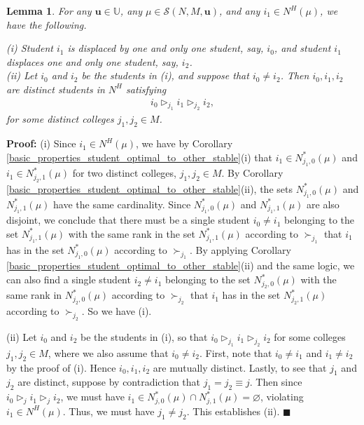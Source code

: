 \documentclass[12pt, fullpage]{amsart}
\newtheorem{lemma}{Lemma}[section]
\theoremstyle{definition}
\theoremstyle{definition}
\theoremstyle{definition}
\begin{document}
\begin{bibunit}[econometrica]
\begin{lemma}\label{every_student_displaces_and_is_displaced}
For any $\boldsymbol{u}\in \mathbb{U}$, any $\mu \in  \mathcal{S}(N,M,\boldsymbol{u})$, and any $i_{1}\in N^{H}(\mu)$, we have the following.

\noindent (i) Student $i_{1}$ is displaced by one and only one student, say, $i_{0}$, and student $i_{1}$ displaces one and only one student, say, $i_{2}$.\\
\noindent (ii)  Let $i_{0}$ and $i_{2}$ be the students in (i), and suppose that $i_{0}\ne i_{2}$. Then $i_{0},i_{1},i_{2}$ are distinct students in $N^{H}$ satisfying 
\begin{align}
	i_{0}\vartriangleright_{j_{1}} i_{1}\vartriangleright_{j_{2}} i_{2},
\end{align}
for some distinct colleges $j_{1},j_{2}\in M$.

\end{lemma}
\noindent \textbf{Proof: } (i) Since $i_{1}\in N^{H}(\mu)$, we have by Corollary \ref{basic_properties_student_optimal_to_other_stable}(i) that   $i_{1}\in N^{*}_{j_{1},0}(\mu)$ and $i_{1}\in N^{*}_{j_{2},1}(\mu)$ for two distinct colleges, $j_{1},j_{2}\in M$. By Corollary \ref{basic_properties_student_optimal_to_other_stable}(ii), the sets $N^{*}_{j_{1},0}(\mu)$ and $N^{*}_{j_{1},1}(\mu)$ have the same cardinality. Since $N^{*}_{j_{1},0}(\mu)$ and $N^{*}_{j_{1},1}(\mu)$ are also disjoint, we conclude that there must be a single student $i_{0}\ne i_{1}$ belonging to the set $N^{*}_{j_{1},1}(\mu)$ with the same rank in the set $N^{*}_{j_{1},1}(\mu)$ according to $\succ_{j_{1}}$ that $i_{1}$ has in the set $N^{*}_{j_{1},0}(\mu)$ according to $\succ_{j_{1}}$.  By applying Corollary \ref{basic_properties_student_optimal_to_other_stable}(ii) and the same logic, we can also find a single student $i_{2}\ne i_{1}$ belonging to the set $N^{*}_{j_{2},0}(\mu)$ with the same rank in $N^{*}_{j_{2},0}(\mu)$ according to  $\succ_{j_{2}}$  that $i_{1}$ has in the set $N^{*}_{j_{2},1}(\mu)$ according to  $\succ_{j_{2}}$. So we have (i).  

(ii) Let $i_{0}$ and $i_{2}$ be the students in (i), so that $i_{0}\vartriangleright_{j_{1}} i_{1}\vartriangleright_{j_{2}} i_{2}$ for some colleges  $j_{1},j_{2}\in M$, where we also assume that $i_{0}\ne i_{2}$. First, note that $i_{0}\ne i_{1}$ and $i_{1}\ne i_{2}$ by the proof of (i). Hence $i_{0},i_{1},i_{2}$ are mutually distinct. Lastly, to see that $j_{1}$ and $j_{2}$ are distinct, suppose by contradiction that $j_{1}=j_{2}\equiv j$. Then since $i_{0}\vartriangleright_{j} i_{1}\vartriangleright_{j} i_{2}$, we must have $i_{1}\in N^{*}_{j,0}(\mu) \cap N^{*}_{j,1}(\mu)=\varnothing$, violating $i_{1}\in N^{H}(\mu)$. Thus, we must have $j_{1}\ne j_{2}$. This establishes (ii). $\blacksquare$


\end{bibunit}
\end{document}
